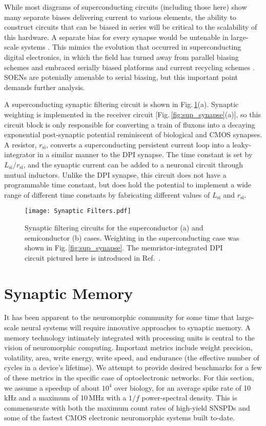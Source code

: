 \documentclass[twocolumn]{article}
\newcommand{\onlinecite}[1]{\hspace{-1 ex} \nocite{#1}\citenum{#1}}
\begin{document}
While most diagrams of superconducting circuits (including those here) show many separate biases delivering current to various elements, the ability to construct circuits that can be biased in series will be critical to the scalability of this hardware. A separate bias for every synapse would be untenable in large-scale systems \cite{tolpygo2016superconductor}. This mimics the evolution that occurred in superconducting digital electronics, in which the field has turned away from parallel biasing schemes and embraced serially biased platforms \cite{tolpygo2016superconductor} and current recycling schemes \cite{kisa2011}. SOENs are potenially amenable to serial biasing, but this important point demands further analysis.

A superconducting synaptic filtering circuit is shown in Fig.\,\ref{fig:filtering}(a). Synaptic weighting is implemented in the receiver circuit [Fig.\,\ref{fig:sup_synapse}(a)], so this circuit block is only responsible for converting a train of fluxons into a decaying exponential post-synaptic potential reminiscent of biological and CMOS synapses. A resistor, $r_{\mathrm{si}}$, converts a superconducting persistent current loop into a leaky-integrator in a similar manner to the DPI synapse. The time constant is set by $L_{\mathrm{si}}/r_{\mathrm{si}}$, and the synaptic current can be added to a neuronal circuit through mutual inductors. Unlike the DPI synapse, this circuit does not have a programmable time constant, but does hold the potential to implement a wide range of different time constants by fabricating different values of $L_{\mathrm{si}}$ and $r_{\mathrm{si}}$.
\begin{figure}[h!]
    \centering
    \texttt{[image: Synaptic Filters.pdf]}
    \caption{Synaptic filtering circuits for the superconductor (a) and semiconductor (b) cases. Weighting in the superconducting case was shown in Fig.\,\ref{fig:sup_synapse}. The memristor-integrated DPI circuit pictured here is introduced in Ref.\,\onlinecite{dalgaty2019hybrid}. }
    \label{fig:filtering}
\end{figure}

\section{\label{sec:memory}Synaptic Memory}
It has been apparent to the neuromorphic community for some time that large-scale neural systems will require innovative approaches to synaptic memory. A memory technology intimately integrated with processing units is central to the vision of neuromorphic computing. Important metrics include weight precision, volatility, area, write energy, write speed, and endurance (the effective number of cycles in a device's lifetime). We attempt to provide desired benchmarks for a few of these metrics in the specific case of optoelectronic networks. For this section, we assume a speedup of about $10^4$ over biology, for an average spike rate of 10\,kHz and a maximum of 10\,MHz with a $1/f$ power-spectral density. This is commensurate with both the maximum count rates of high-yield SNSPDs and some of the fastest CMOS electronic neuromorphic systems built to-date.
\end{document}
